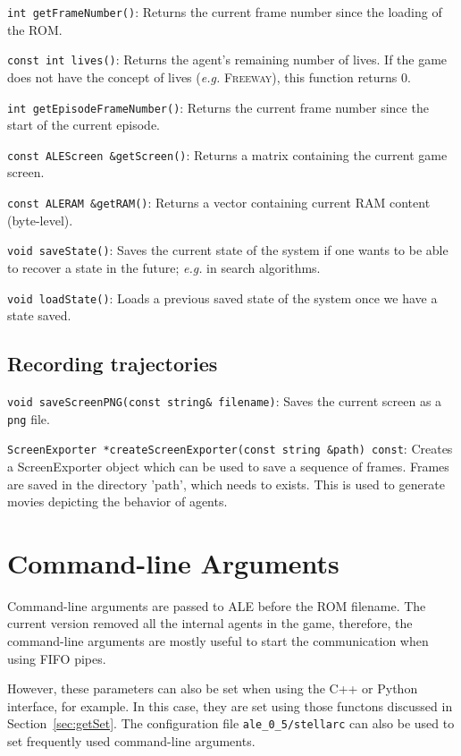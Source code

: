 \documentclass[12pt]{article}
\begin{document}
  \verb+int getFrameNumber()+: Returns the current frame number since the loading of the ROM.
  
  \verb+const int lives()+: Returns the agent's remaining number of lives. If the game does not have 
  the concept of lives (\emph{e.g.} \textsc{Freeway}), this function returns 0.
  
  \verb+int getEpisodeFrameNumber()+: Returns the current frame number since the start of the
  current episode.
  
  \verb+const ALEScreen &getScreen()+: Returns a matrix containing the current game screen.
  
  \verb+const ALERAM &getRAM()+: Returns a vector containing current RAM content (byte-level).
  
  \verb+void saveState()+: Saves the current state of the system if one wants to be able to recover 
  a state in the future; \emph{e.g.} in search algorithms.
  
  \verb+void loadState()+: Loads a previous saved state of the system once we have a state saved.

  \subsection{Recording trajectories}
   
  \indent \indent \verb+void saveScreenPNG(const string& filename)+: Saves the current screen as
  a \verb+png+ file.
  
  \verb+ScreenExporter *createScreenExporter(const string &path) const+: Creates a 
  ScreenExporter object which can be used to save a sequence of frames. Frames are saved 
  in the directory 'path', which needs to exists. This is used to generate movies depicting the behavior
  of agents.
  
\section{Command-line Arguments}\label{sec:arguments}

Command-line arguments are passed to ALE before the ROM filename. The current version removed all 
the internal agents in the game, therefore, the command-line arguments are mostly useful to start 
the communication when using FIFO pipes.

However, these parameters can also be set when using the C++ or Python interface, for example. In 
this case, they are set using those functons discussed in Section~\ref{sec:getSet}. The configuration file 
\verb+ale_0_5/stellarc+ can also be used to set frequently used command-line arguments.  
\end{document}
